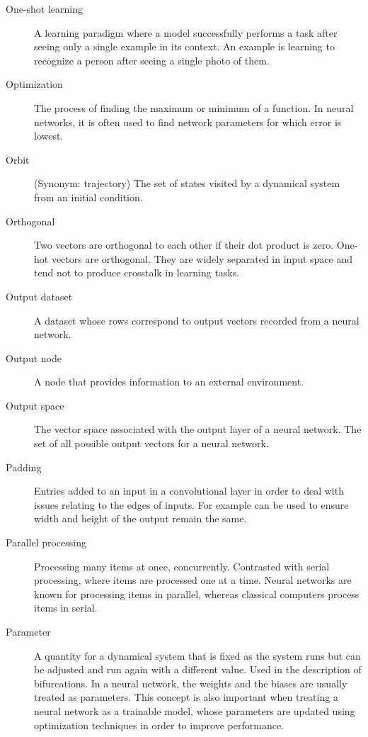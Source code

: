 \begin{description}
\item[One-shot learning] A learning paradigm where a model successfully performs a task after seeing only a single example in its context. An example is learning to recognize a person after seeing a single photo of them.

\item[Optimization] The process of finding the maximum or minimum of a function. In neural networks, it is often used to find network parameters for which error is lowest.

\item[Orbit] (Synonym: trajectory) The set of states visited by a dynamical system from an initial condition.


\item[Orthogonal] Two vectors are orthogonal to each other if their dot product is zero. One-hot vectors are orthogonal. They are widely separated in input space and tend not to produce crosstalk in learning tasks.

\item[Output dataset] A dataset whose rows correspond to output vectors recorded from a neural network.

\item[Output node] A node that provides information to an external environment.

\item[Output space] The vector space associated with the output layer of a neural network. The set of all possible output vectors for a neural network.

\item[Padding] Entries added to an input in a convolutional layer in order to deal with issues relating to the edges of inputs. For example can be used to ensure width and height of the output remain the same.

\item[Parallel processing] Processing many items at once, concurrently. Contrasted with serial processing, where items are processed one at a time.  Neural networks are known for processing items in parallel, whereas classical computers process items in serial.

\item[Parameter] A quantity for a dynamical system that is fixed as the system runs but can be adjusted and run again with a different value. Used in the description of bifurcations. In a neural network, the weights and the biases are usually treated as parameters. This concept is also important when treating a neural network as a trainable model, whose parameters are updated using optimization techniques in order to improve performance.


\end{description}
